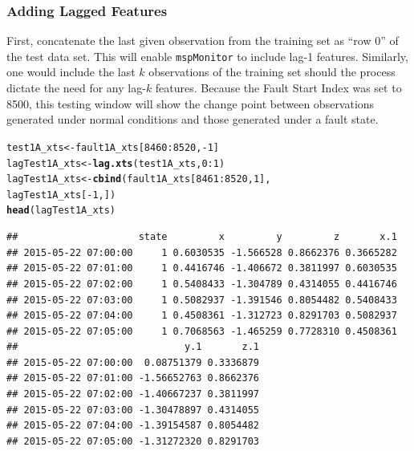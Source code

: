 \documentclass{report}\usepackage[]{graphicx}\usepackage[]{color}
\makeatletter
\newcommand{\hlnum}[1]{\textcolor[rgb]{0.686,0.059,0.569}{#1}}%
\newcommand{\hlopt}[1]{\textcolor[rgb]{0,0,0}{#1}}%
\newcommand{\hlstd}[1]{\textcolor[rgb]{0.345,0.345,0.345}{#1}}%
\newcommand{\hlkwb}[1]{\textcolor[rgb]{0.69,0.353,0.396}{#1}}%
\newcommand{\hlkwd}[1]{\textcolor[rgb]{0.737,0.353,0.396}{\textbf{#1}}}%
\newenvironment{kframe}{%
 \def\at@end@of@kframe{}%
 \ifinner\ifhmode%
  \def\at@end@of@kframe{\end{minipage}}%
  \begin{minipage}{\columnwidth}%
 \fi\fi%
 \def\FrameCommand##1{\hskip\@totalleftmargin \hskip-\fboxsep
 \colorbox{shadecolor}{##1}\hskip-\fboxsep
     \hskip-\linewidth \hskip-\@totalleftmargin \hskip\columnwidth}%
 \MakeFramed {\advance\hsize-\width
   \@totalleftmargin\z@ \linewidth\hsize
   \@setminipage}}%
 {\par\unskip\endMakeFramed%
 \at@end@of@kframe}
\newenvironment{knitrout}{}{} %
\makeatother
\begin{document}
\subsubsection{Adding Lagged Features}
First, concatenate the last given observation from the training set as ``row 0'' of the test data set. This will enable \texttt{mspMonitor} to include lag-1 features. Similarly, one would include the last $k$ observations of the training set should the process dictate the need for any lag-$k$ features. Because the Fault Start Index was set to 8500, this testing window will show the change point between observations generated under normal conditions and those generated under a fault state.
\begin{knitrout}
\color{fgcolor}\begin{kframe}
\begin{alltt}
\hlstd{test1A_xts} \hlkwb{<-} \hlstd{fault1A_xts[}\hlnum{8460}\hlopt{:}\hlnum{8520}\hlstd{,} \hlopt{-}\hlnum{1}\hlstd{]}
\hlstd{lagTest1A_xts} \hlkwb{<-} \hlkwd{lag.xts}\hlstd{(test1A_xts,} \hlnum{0}\hlopt{:}\hlnum{1}\hlstd{)}
\hlstd{lagTest1A_xts} \hlkwb{<-} \hlkwd{cbind}\hlstd{(fault1A_xts[}\hlnum{8461}\hlopt{:}\hlnum{8520}\hlstd{,}\hlnum{1}\hlstd{],}
                       \hlstd{lagTest1A_xts[}\hlopt{-}\hlnum{1}\hlstd{,])}
\hlkwd{head}\hlstd{(lagTest1A_xts)}
\end{alltt}
\begin{verbatim}
##                     state         x         y         z       x.1
## 2015-05-22 07:00:00     1 0.6030535 -1.566528 0.8662376 0.3665282
## 2015-05-22 07:01:00     1 0.4416746 -1.406672 0.3811997 0.6030535
## 2015-05-22 07:02:00     1 0.5408433 -1.304789 0.4314055 0.4416746
## 2015-05-22 07:03:00     1 0.5082937 -1.391546 0.8054482 0.5408433
## 2015-05-22 07:04:00     1 0.4508361 -1.312723 0.8291703 0.5082937
## 2015-05-22 07:05:00     1 0.7068563 -1.465259 0.7728310 0.4508361
##                             y.1       z.1
## 2015-05-22 07:00:00  0.08751379 0.3336879
## 2015-05-22 07:01:00 -1.56652763 0.8662376
## 2015-05-22 07:02:00 -1.40667237 0.3811997
## 2015-05-22 07:03:00 -1.30478897 0.4314055
## 2015-05-22 07:04:00 -1.39154587 0.8054482
## 2015-05-22 07:05:00 -1.31272320 0.8291703
\end{verbatim}
\end{kframe}
\end{knitrout}
\end{document}
